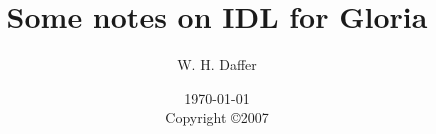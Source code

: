 


\NC{\BAT}{\begin{alltt}}
\NC{\EAT}{\end{alltt}}


%
%
\documentclass[11pt,dvips]{report}
\usepackage{alltt,makeidx}
\usepackage[usenames]{color}
\usepackage[none,bottom,light]{draftcopy}
\usepackage{times}
\usepackage{wasysym}
\usepackage{listings}
\setlength{\parindent}{0in}
\setlength{\parskip}{2mm}


\newenvironment{IDLExample}{%
\begin{color}{IDLExampleColor} 
}
{
\end{color}
}


\title{Some notes on IDL for Gloria}

\author{W. H. Daffer}
\date{\today \\
        Copyright \copyright 2007}

\makeindex

\maketitle
\newpage

\tableofcontents

\newpage
\chapter{Conventions}

\chapter{Structures}



